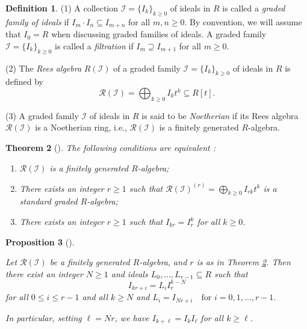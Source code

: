 \documentclass[11pt,reqno,a4paper]{amsart}
\newtheorem{theorem}{Theorem}[section]
\newtheorem{proposition}[theorem]{Proposition}
\theoremstyle{definition}
\newtheorem{definition}[theorem]{Definition}
\begin{document}
\begin{definition}
(1) A collection  $\mathcal{I} = \{I_k\}_{k \ge 0}$  of ideals in $R$ is called a \emph{graded family of ideals} if $I_{m}\cdot I_{n}\subseteq I_{m + n}$ for all $m,n\geq 0$.
By convention, we will assume that $I_{0} = R$ when discussing graded families of ideals.
A graded family $\mathcal{I} = \{I_k\}_{k \ge 0}$ is called a \emph{filtration} if $I_{m}\supseteq I_{m + 1}$ for all $m\geq 0$.

\noindent (2) The \emph{Rees algebra} $R(\mathcal{I})$  of a graded family $\mathcal{I} = \{I_k\}_{k \ge 0}$  of ideals in $R$ is defined by
\[
\mathcal{R}(\mathcal{I}) = \bigoplus_{k\geq 0}I_{k}t^{k}\subseteq R[t].
\]

\noindent (3) A graded family $\mathcal{I}$ of ideals in $R$ is said to be \emph{Noetherian} if its Rees algebra $\mathcal{R}(\mathcal{I})$ is a Noetherian ring, i.e., $\mathcal{R}(\mathcal{I})$ is a finitely generated $R$-algebra.

\end{definition}



\begin{theorem}[{\cite[Theorem 2.1]{HerzogHibiTrung07}}]
\label{r}The following conditions are equivalent :
\begin{enumerate}
    \item[(i)] $\mathcal{R}(\mathcal{I})$ is a finitely generated $R$-algebra;
    \item[(ii)] There exists an integer $r \geq 1$ such that $\mathcal{R}(\mathcal{I})^{(r)}= \bigoplus_{k\geq 0}I_{rk}t^{k}$ is a standard graded $R$-algebra;
    \item[(iii)] There exists an integer $r \geq 1$ such that $I_{kr} = I_r^k$ for all $k \geq 0$.
\end{enumerate}

\end{theorem}

\begin{proposition}[{\cite[Proposition 2.8]{HaNguyenNguyen25}}]
\label{Proposition 2.8.}

\noindent Let $\mathcal{R}(\mathcal{I})$ be a finitely generated \(R\)-algebra, and \(r\) is as in Theorem \ref{r}. Then there exist an integer \(N\geq 1\) and ideals \(L_0,\ldots,L_{r-1}\subseteq R\) such that
\[
I_{kr+i} = L_i I_r^{k-N}
\]
for all \(0\leq i\leq r-1\) and all \(k\geq N\) and \(
L_i = I_{Nr + i} \quad \text{for } i = 0,1,\dots, r-1.
\)

In particular, setting \(\ell = Nr\), we have \(I_{k+\ell} = I_k I_\ell\) for all \(k\geq \ell\).



    
\end{proposition}
\end{document}
